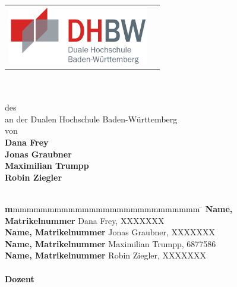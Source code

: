 
\begin{titlepage}
	\begin{longtable}{p{} p{}}
	  {\includegraphics[height=2.6cm]{images/dhbw.png}}
	\end{longtable}
	\enlargethispage{40mm}
	\begin{center}
	  \vspace*{12mm}	{\LARGE\bf \titel }\\
	  \vspace*{12mm}	{\large\bf \arbeit}\\
	  \vspace*{12mm}	des \studiengang\\
	  \vspace*{3mm} 	an der Dualen Hochschule Baden-Württemberg \dhbw\\
	  \vspace*{12mm}	von\\
	  \vspace*{3mm} 	\large\bf Dana Frey\\
   	  \vspace*{3mm} 	\large\bf Jonas Graubner\\
      \vspace*{3mm} 	\large\bf Maximilian Trumpp\\
      \vspace*{3mm} 	\large\bf Robin Ziegler\\
	  \vspace*{12mm}	\datumAbgabe\\
	\end{center}
	\vfill
	\begin{spacing}{1.2}
	\begin{tabbing}
        \textbf mmmmmmmmmmmmmmmmmmmmmmmmmmmm  \= \kill
        \textbf{Name, Matrikelnummer}  \>  Dana Frey, XXXXXXX \\
        \textbf{Name, Matrikelnummer}  \>  Jonas Graubner, XXXXXXX \\
		\textbf{Name, Matrikelnummer}  \>  Maximilian Trumpp, 6877586 \\
        \textbf{Name, Matrikelnummer}  \>  Robin Ziegler, XXXXXXX \\
        \\
		\textbf{Dozent}              \>  \betreuer\\
	\end{tabbing}
	\end{spacing}
\end{titlepage}
